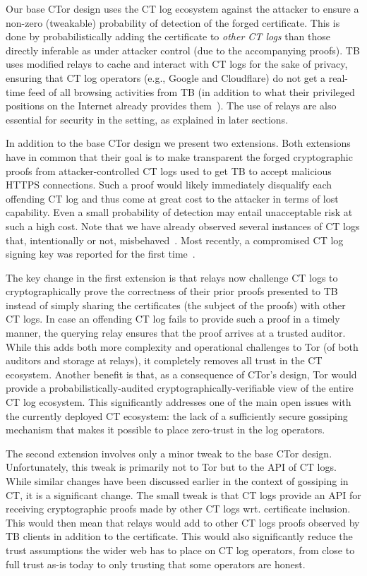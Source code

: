 Our base CTor design uses the CT log ecosystem against the attacker to ensure a
non-zero (tweakable) probability of detection of the forged certificate. This is
done by probabilistically adding the certificate to \emph{other CT logs} than
those directly inferable as under attacker control (due to the accompanying
proofs). TB uses modified relays to cache and interact with CT logs for the sake
of privacy, ensuring that CT log operators (e.g., Google and Cloudflare) do not
get a real-time feed of all browsing activities from TB (in addition to what
their privileged positions on the Internet already provides
them~\cite{1mtrack,TorDNS}). The use of relays are also essential for security
in the setting, as explained in later sections.

In addition to the base CTor design we present two extensions. Both extensions
have in common that their goal is to make transparent the forged cryptographic
proofs from attacker-controlled CT logs used to get TB to accept malicious HTTPS
connections. Such a proof would likely immediately disqualify each offending CT
log and thus come at great cost to the attacker in terms of lost capability.
Even a small probability of detection may entail unacceptable risk at such a
high cost. Note that we have already observed several instances of CT logs that,
intentionally or not,
misbehaved~\cite{izenpe-disqualified,venafi-disqualified,gdca1-omission}. Most
recently, a compromised CT log signing key was reported for the first
time~\cite{digicert-log-compromised}. 

The key change in the first extension is that relays now challenge CT logs to
cryptographically prove the correctness of their prior proofs presented to TB
instead of simply sharing the certificates (the subject of the proofs) with
other CT logs. In case an offending CT log fails to provide such a proof
in a timely manner,
the querying relay ensures that the proof arrives at a trusted auditor. While
this adds both more complexity and operational challenges to Tor (of both
auditors and storage at relays), it completely removes all trust in the CT
ecosystem. Another benefit is that, as a consequence of CTor's design, Tor would
provide a probabilistically-audited cryptographically-verifiable view of the
entire CT log ecosystem. This significantly addresses one of the main open
issues with the currently deployed CT ecosystem: the lack of a sufficiently
secure gossiping mechanism that makes it possible to place zero-trust in the log
operators.

The second extension involves only a minor tweak to the base CTor design.
Unfortunately, this tweak is primarily not to Tor but to the API of CT logs.
While similar changes have been discussed earlier in the context of gossiping in
CT, it is a significant change. The small tweak is that CT logs provide an API
for receiving cryptographic proofs made by other CT logs wrt. certificate
inclusion. This would then mean that relays would add to other CT logs proofs
observed by TB clients in addition to the certificate. This would also
significantly reduce the trust assumptions the wider web has to place on CT log
operators, from close to full trust as-is today to only trusting that some
operators are honest.

